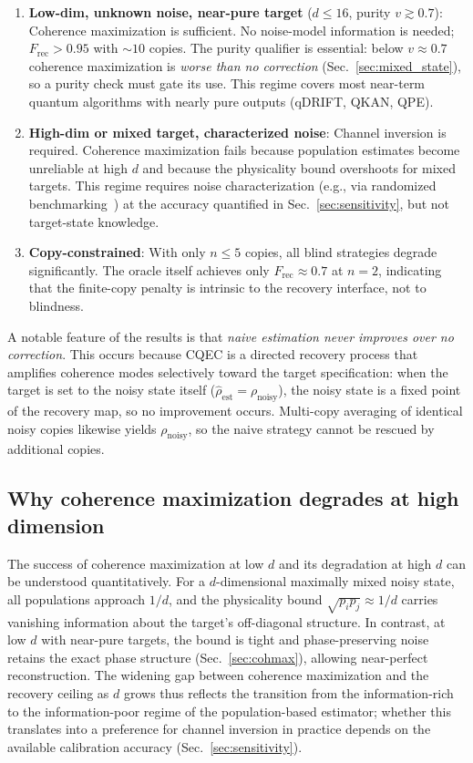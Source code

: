 \documentclass[a4paper,onecolumn]{quantumarticle}
\newcommand{\Frec}{F_\mathrm{rec}}
\newcommand{\rhon}{\rho_\mathrm{noisy}}
\newcommand{\rhoe}{\hat{\rho}_\mathrm{est}}
\begin{document}
\begin{enumerate}
\item \textbf{Low-dim, unknown noise, near-pure target} ($d \leq 16$, purity $v \gtrsim 0.7$): Coherence maximization is sufficient.
No noise-model information is needed; $\Frec > 0.95$ with $\sim\!10$ copies.
The purity qualifier is essential: below $v \approx 0.7$ coherence maximization is \emph{worse than no correction} (Sec.~\ref{sec:mixed_state}), so a purity check must gate its use.
This regime covers most near-term quantum algorithms with nearly pure outputs (qDRIFT, QKAN, QPE).

\item \textbf{High-dim or mixed target, characterized noise}: Channel inversion is required.
Coherence maximization fails because population estimates become unreliable at high $d$ and because the physicality bound overshoots for mixed targets.
This regime requires noise characterization (e.g., via randomized benchmarking~\cite{Emerson2005}) at the accuracy quantified in Sec.~\ref{sec:sensitivity}, but not target-state knowledge.

\item \textbf{Copy-constrained}: With only $n \leq 5$ copies, all blind strategies degrade significantly.
The oracle itself achieves only $\Frec \approx 0.7$ at $n = 2$, indicating that the finite-copy penalty is intrinsic to the recovery interface, not to blindness.
\end{enumerate}

A notable feature of the results is that \emph{naive estimation never improves over no correction}.
This occurs because CQEC is a directed recovery process that amplifies coherence modes selectively toward the target specification: when the target is set to the noisy state itself ($\rhoe = \rhon$), the noisy state is a fixed point of the recovery map, so no improvement occurs.
Multi-copy averaging of identical noisy copies likewise yields $\rhon$, so the naive strategy cannot be rescued by additional copies.


\subsection{Why coherence maximization degrades at high dimension}
\label{sec:cohmax_principle}

The success of coherence maximization at low $d$ and its degradation at high $d$ can be understood quantitatively.
For a $d$-dimensional maximally mixed noisy state, all populations approach $1/d$, and the physicality bound $\sqrt{p_i p_j} \approx 1/d$ carries vanishing information about the target's off-diagonal structure.
In contrast, at low $d$ with near-pure targets, the bound is tight and phase-preserving noise retains the exact phase structure (Sec.~\ref{sec:cohmax}), allowing near-perfect reconstruction.
The widening gap between coherence maximization and the recovery ceiling as $d$ grows thus reflects the transition from the information-rich to the information-poor regime of the population-based estimator; whether this translates into a preference for channel inversion in practice depends on the available calibration accuracy (Sec.~\ref{sec:sensitivity}).
\end{document}
